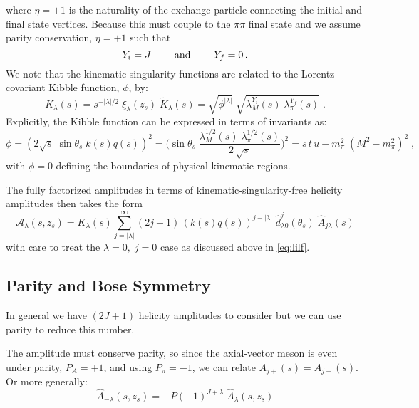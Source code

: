 where \(\eta = \pm1\) is the naturality of the exchange particle connecting the initial and final state vertices. Because this must couple to the \(\pi\pi\) final state and we assume parity conservation, \(\eta = +1\) such that
  \begin{equation}
    Y_i =  J \qquad \text{ and } \qquad  Y_f =  0 \, .
    \end{equation}
We note that the kinematic singularity functions are related to the Lorentz-covariant Kibble function, \(\phi\), by:
  \begin{equation}
    \label{eq:k-factor}
    K_\lambda(s) = s^{-|\lambda|/2} \; \xi_{\lambda}(z_s) \; \tilde{K}_{\lambda}(s) = \sqrt{\phi^{|\lambda|}} \; \sqrt{\lambda_M^{Y_i}(s) \; \lambda_\pi^{Y_f}(s)}\;  .
  \end{equation}
Explicitly, the Kibble function can be expressed in terms of invariants as:
  \begin{equation} \label{eq:kibble}
    \phi = (2\sqrt{s} \; \sin \theta_s \; k(s) q(s))^2 =  \bigg( \sin\theta_s \; \frac{\lambda^{1/2}_M(s) \; \lambda^{1/2}_\pi(s)}{2 \,\sqrt{s}} \bigg)^2 = s \, t\, u - m_\pi^2 \;(M^2 - m_\pi^2)^2 \; ,
  \end{equation}
with \(\phi = 0\) defining the boundaries of physical kinematic regions.

The fully factorized amplitudes in terms of kinematic-singularity-free helicity amplitudes then takes the form
  \begin{equation}
    \label{eq:helicity-final}
    \mathcal{A}_\lambda(s,z_s) =  K_{\lambda}(s)  \sum_{j= |\lambda|}^\infty (2j+1) \, (k(s)q(s))^{j- |\lambda|} \; \hat{d}^j_{\lambda0}(\theta_s)  \; \hat{A}_{j\lambda}(s)
  \end{equation}
with care to treat the \(\lambda =0, \;  j=0\) case as discussed above in \cref{eq:lilf}.
\subsection{Parity and Bose Symmetry} \label{sec:symmetry}
In general we have \((2J+1)\) helicity amplitudes to consider but we can use parity to reduce this number.

The amplitude must conserve parity, so since the axial-vector meson is even under parity, \( P_A = +1\), and using \(P_\pi = -1\), we can relate \(A_{j+}(s) = A_{j-}(s)\). Or more generally:
  \begin{equation}
    \label{parity-jpc}
    \hat{A}_{-\lambda}(s,z_s) = -P(-1)^{J+\lambda} \; \hat{A}_{\lambda}(s,z_s)
  \end{equation}

